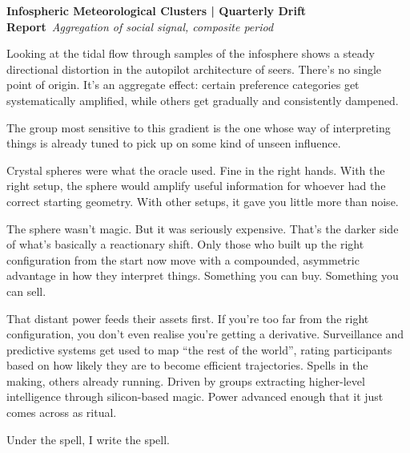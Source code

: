 \begin{archivefragment}
\textbf{Infospheric Meteorological Clusters | Quarterly Drift Report}\
\textit{Aggregation of social signal, composite period}

Looking at the tidal flow through samples of the infosphere shows a steady directional distortion in the autopilot architecture of seers. There’s no single point of origin. It’s an aggregate effect: certain preference categories get systematically amplified, while others get gradually and consistently dampened.

The group most sensitive to this gradient is the one whose way of interpreting things is already tuned to pick up on some kind of unseen influence.

\end{archivefragment}

Crystal spheres were what the oracle used. Fine in the right hands. With the right setup, the sphere would amplify useful information for whoever had the correct starting geometry. With other setups, it gave you little more than noise.


The sphere wasn’t magic. But it was seriously expensive. That’s the darker side of what’s basically a reactionary shift. Only those who built up the right configuration from the start now move with a compounded, asymmetric advantage in how they interpret things. Something you can buy. Something you can sell.

That distant power feeds their assets first. If you’re too far from the right configuration, you don’t even realise you’re getting a derivative. Surveillance and predictive systems get used to map “the rest of the world”, rating participants based on how likely they are to become efficient trajectories. Spells in the making, others already running. Driven by groups extracting higher-level intelligence through silicon-based magic. Power advanced enough that it just comes across as ritual.

Under the spell, I write the spell.

